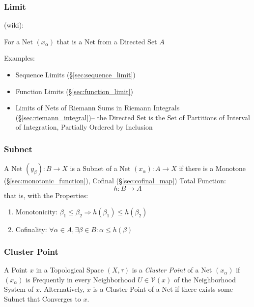 \subsubsection{Limit}\label{sec:net_limit}

(wiki):

For a Net $(x_\alpha)$ that is a Net from a Directed Set $A$

Examples:

\begin{itemize}
  \item Sequence Limits (\S\ref{sec:sequence_limit})
  \item Function Limits (\S\ref{sec:function_limit})
  \item Limits of Nets of Riemann Sums in Riemann Integrals
    (\S\ref{sec:riemann_integral})-- the Directed Set is the Set of Partitions
    of Interval of Integration, Partially Ordered by Inclusion
\end{itemize}



\subsubsection{Subnet}\label{sec:subnet}

A Net $(y_\beta) : B \rightarrow X$ is a Subnet of a Net $(x_\alpha) :
A \rightarrow X$ if there is a Monotone
(\S\ref{sec:monotonic_function}), Cofinal (\S\ref{sec:cofinal_map})
Total Function:
\[
  h : B \rightarrow A
\]
that is, with the Properties:
\begin{enumerate}
  \item Monotonicity:
  $\beta_1 \leq \beta_2 \Rightarrow h(\beta_1) \leq h(\beta_2)$
  \item Cofinality:
   $\forall \alpha \in A, \exists \beta \in B : \alpha \leq h(\beta)$
\end{enumerate}



\subsubsection{Cluster Point}\label{sec:cluster_point}

A Point $x$ in a Topological Space $(X,\tau)$ is a \emph{Cluster
  Point} of a Net $(x_\alpha)$ if $(x_\alpha)$ is Frequently in every
Neighborhood $U \in \mathcal{V}(x)$ of the Neighborhood System of $x$.
Alternatively, $x$ is a Cluster Point of a Net if there exists some
Subnet that Converges to $x$.



